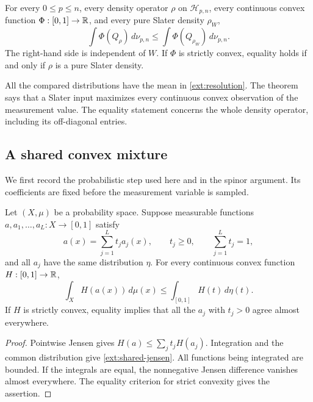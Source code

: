 \begin{theorem}
\label{ext:convex-order}
For every $0\le p\le n$, every density operator $\rho$ on
$\mathcal H_{p,n}$, every continuous convex function
$\Phi:[0,1]\to\mathbb R$, and every pure Slater density $\rho_W$,
\begin{equation}
 \int\Phi(Q_\rho)\,d\nu_{p,n}
 \le
 \int\Phi(Q_{\rho_W})\,d\nu_{p,n}.
 \label{ext:order}
\end{equation}
The right-hand side is independent of $W$. If $\Phi$ is strictly
convex, equality holds if and only if $\rho$ is a pure Slater density.
\end{theorem}

All the compared distributions have the mean in
\eqref{ext:resolution}. The theorem says that a Slater input maximizes
every continuous convex observation of the measurement value. The
equality statement concerns the whole density operator, including its
off-diagonal entries.

\subsection{A shared convex mixture}

We first record the probabilistic step used here and in the spinor
argument. Its coefficients are fixed before the measurement variable
is sampled.

\begin{lemma}
\label{ext:common-mixture}
Let $(X,\mu)$ be a probability space. Suppose measurable functions
$a,a_1,\ldots,a_L:X\to[0,1]$ satisfy
\[
 a(x)=\sum_{j=1}^L t_j a_j(x),\qquad
 t_j\ge0,\qquad\sum_{j=1}^L t_j=1,
\]
and all $a_j$ have the same distribution $\eta$. For every continuous
convex function $H:[0,1]\to\mathbb R$,
\begin{equation}
 \int_X H(a(x))\,d\mu(x)
 \le \int_{[0,1]}H(t)\,d\eta(t).
 \label{ext:shared-jensen}
\end{equation}
If $H$ is strictly convex, equality implies that all the $a_j$ with
$t_j>0$ agree almost everywhere.
\end{lemma}
\begin{proof}
Pointwise Jensen gives $H(a)\le\sum_jt_jH(a_j)$. Integration and
the common distribution give \eqref{ext:shared-jensen}. All functions
being integrated are bounded. If the integrals are equal, the
nonnegative Jensen difference vanishes almost everywhere. The equality
criterion for strict convexity gives the assertion.
\end{proof}

